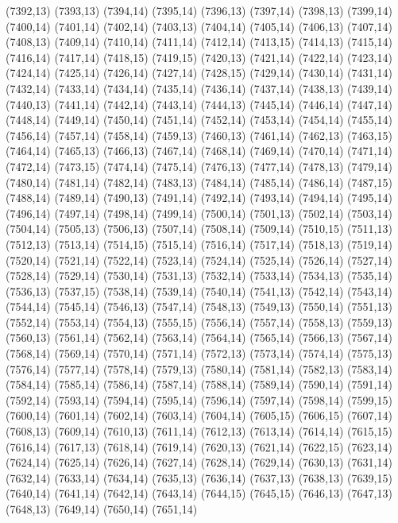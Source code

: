 (7392,13)
(7393,13)
(7394,14)
(7395,14)
(7396,13)
(7397,14)
(7398,13)
(7399,14)
(7400,14)
(7401,14)
(7402,14)
(7403,13)
(7404,14)
(7405,14)
(7406,13)
(7407,14)
(7408,13)
(7409,14)
(7410,14)
(7411,14)
(7412,14)
(7413,15)
(7414,13)
(7415,14)
(7416,14)
(7417,14)
(7418,15)
(7419,15)
(7420,13)
(7421,14)
(7422,14)
(7423,14)
(7424,14)
(7425,14)
(7426,14)
(7427,14)
(7428,15)
(7429,14)
(7430,14)
(7431,14)
(7432,14)
(7433,14)
(7434,14)
(7435,14)
(7436,14)
(7437,14)
(7438,13)
(7439,14)
(7440,13)
(7441,14)
(7442,14)
(7443,14)
(7444,13)
(7445,14)
(7446,14)
(7447,14)
(7448,14)
(7449,14)
(7450,14)
(7451,14)
(7452,14)
(7453,14)
(7454,14)
(7455,14)
(7456,14)
(7457,14)
(7458,14)
(7459,13)
(7460,13)
(7461,14)
(7462,13)
(7463,15)
(7464,14)
(7465,13)
(7466,13)
(7467,14)
(7468,14)
(7469,14)
(7470,14)
(7471,14)
(7472,14)
(7473,15)
(7474,14)
(7475,14)
(7476,13)
(7477,14)
(7478,13)
(7479,14)
(7480,14)
(7481,14)
(7482,14)
(7483,13)
(7484,14)
(7485,14)
(7486,14)
(7487,15)
(7488,14)
(7489,14)
(7490,13)
(7491,14)
(7492,14)
(7493,14)
(7494,14)
(7495,14)
(7496,14)
(7497,14)
(7498,14)
(7499,14)
(7500,14)
(7501,13)
(7502,14)
(7503,14)
(7504,14)
(7505,13)
(7506,13)
(7507,14)
(7508,14)
(7509,14)
(7510,15)
(7511,13)
(7512,13)
(7513,14)
(7514,15)
(7515,14)
(7516,14)
(7517,14)
(7518,13)
(7519,14)
(7520,14)
(7521,14)
(7522,14)
(7523,14)
(7524,14)
(7525,14)
(7526,14)
(7527,14)
(7528,14)
(7529,14)
(7530,14)
(7531,13)
(7532,14)
(7533,14)
(7534,13)
(7535,14)
(7536,13)
(7537,15)
(7538,14)
(7539,14)
(7540,14)
(7541,13)
(7542,14)
(7543,14)
(7544,14)
(7545,14)
(7546,13)
(7547,14)
(7548,13)
(7549,13)
(7550,14)
(7551,13)
(7552,14)
(7553,14)
(7554,13)
(7555,15)
(7556,14)
(7557,14)
(7558,13)
(7559,13)
(7560,13)
(7561,14)
(7562,14)
(7563,14)
(7564,14)
(7565,14)
(7566,13)
(7567,14)
(7568,14)
(7569,14)
(7570,14)
(7571,14)
(7572,13)
(7573,14)
(7574,14)
(7575,13)
(7576,14)
(7577,14)
(7578,14)
(7579,13)
(7580,14)
(7581,14)
(7582,13)
(7583,14)
(7584,14)
(7585,14)
(7586,14)
(7587,14)
(7588,14)
(7589,14)
(7590,14)
(7591,14)
(7592,14)
(7593,14)
(7594,14)
(7595,14)
(7596,14)
(7597,14)
(7598,14)
(7599,15)
(7600,14)
(7601,14)
(7602,14)
(7603,14)
(7604,14)
(7605,15)
(7606,15)
(7607,14)
(7608,13)
(7609,14)
(7610,13)
(7611,14)
(7612,13)
(7613,14)
(7614,14)
(7615,15)
(7616,14)
(7617,13)
(7618,14)
(7619,14)
(7620,13)
(7621,14)
(7622,15)
(7623,14)
(7624,14)
(7625,14)
(7626,14)
(7627,14)
(7628,14)
(7629,14)
(7630,13)
(7631,14)
(7632,14)
(7633,14)
(7634,14)
(7635,13)
(7636,14)
(7637,13)
(7638,13)
(7639,15)
(7640,14)
(7641,14)
(7642,14)
(7643,14)
(7644,15)
(7645,15)
(7646,13)
(7647,13)
(7648,13)
(7649,14)
(7650,14)
(7651,14)
